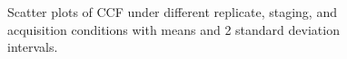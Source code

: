 \documentclass[fleqn,10pt]{wlscirep}
\begin{document}
\begin{figure}


\caption{\label{fig-rep_staging_acquisition}Scatter plots of CCF under
different replicate, staging, and acquisition conditions with means and
2 standard deviation intervals.}

\end{figure}%
\end{document}
